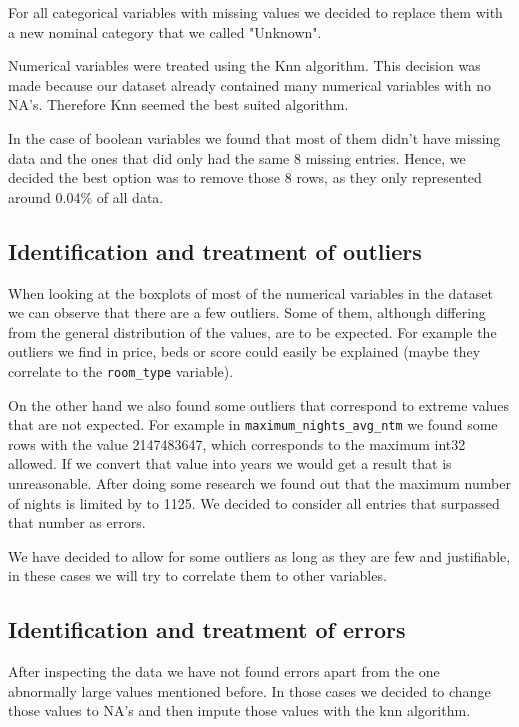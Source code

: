 For all categorical variables with missing values we decided to 
replace them with a new nominal category that we called "Unknown".

Numerical variables were treated using the Knn algorithm. This decision
was made because our dataset already contained many numerical variables
with no NA's. Therefore Knn seemed the best suited algorithm.

In the case of boolean variables we found that most of them didn't have
missing data and the ones that did only had the same 8 missing entries.
Hence, we decided the best option was to remove those 8 rows, as they
only represented around 0.04\% of all data.

\subsection{Identification and treatment of outliers}

When looking at the boxplots of most of the numerical variables in the dataset
we can observe that there are a few outliers. Some of them, although differing
from the general distribution of the values, are to be expected. For example the
outliers we find in price, beds or score could easily be explained (maybe they
correlate to the \texttt{room\_type} variable).

On the other hand we also found some outliers that correspond to extreme values
that are not expected. For example in \texttt{maximum\_nights\_avg\_ntm} we
found some rows with the value 2147483647, which corresponds to the maximum
int32 allowed. If we convert that value into years we would get a result that is
unreasonable. After doing some research we found out that the maximum number of nights is limited by \airbnb to 1125. We decided to consider all entries that surpassed that number as errors. 

We have decided to allow for some outliers as long as they are few and
justifiable, in these cases we will try to correlate them to other variables.

\subsection{Identification and treatment of errors}

After inspecting the data we have not found errors apart from the one abnormally
large values mentioned before. In those cases we decided to change those values to NA's and then impute those values with the knn algorithm.

